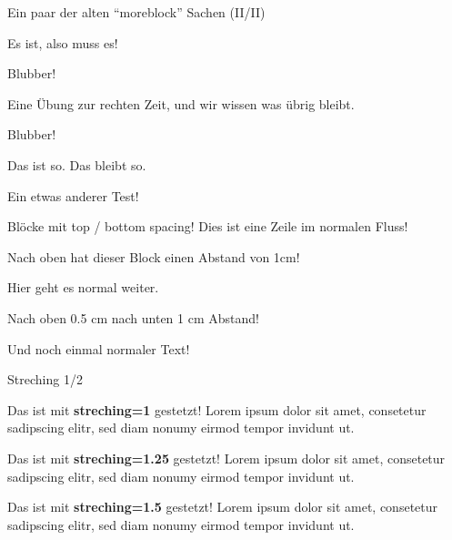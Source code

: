 \documentclass[
  ignorenonframetext,
]{beamer}
\begin{document}
\begin{frame}{Ein paar der alten ``moreblock'' Sachen (II/II)}
\protect\hypertarget{ein-paar-der-alten-moreblock-sachen-iiii-1}{}
\begin{definition}

Es ist, also muss es!

Blubber!

\end{definition}

\begin{Uebung}

Eine Übung zur rechten Zeit, und wir wissen was übrig bleibt.

Blubber!

\end{Uebung}

\begin{Fakt}

Das ist so. Das bleibt so.

\end{Fakt}

\begin{Beispiel}[\(<\) \(>\) \(\leq\)]

Ein etwas anderer Test!

\end{Beispiel}
\end{frame}

\begin{frame}{Blöcke mit top / bottom spacing!}
\protect\hypertarget{bluxf6cke-mit-top-bottom-spacing}{}
Dies ist eine Zeile im normalen Fluss!

\vspace*{1cm}

Nach oben hat dieser Block einen Abstand von 1cm!

Hier geht es normal weiter.

\vspace*{0.5cm}

Nach oben 0.5 cm nach unten 1 cm Abstand!

\vspace*{1cm}

Und noch einmal normaler Text!
\end{frame}

\begin{frame}{Streching 1/2}
\protect\hypertarget{streching-12}{}
{

Das ist mit \textbf{streching=1} gestetzt! Lorem ipsum dolor sit amet,
consetetur sadipscing elitr, sed diam nonumy eirmod tempor invidunt ut.

}

{

Das ist mit \textbf{streching=1.25} gestetzt! Lorem ipsum dolor sit
amet, consetetur sadipscing elitr, sed diam nonumy eirmod tempor
invidunt ut.

}

{

Das ist mit \textbf{streching=1.5} gestetzt! Lorem ipsum dolor sit amet,
consetetur sadipscing elitr, sed diam nonumy eirmod tempor invidunt ut.

}
\end{frame}
\end{document}
